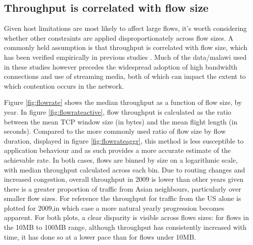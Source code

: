 \subsection{Throughput is correlated with flow size}

Given host limitations are most likely to affect large flows, it's worth considering whether other constraints are applied disproportionately across flow sizes. 
A commonly held assumption is that throughput is correlated with flow size, which has been verified empirically in previous studies \cite{oursTCP, Zhang:2002p85}.
Much of the data/malawi used in these studies however precedes the widespread adoption of high bandwidth connections and use of streaming media, both of which can impact the extent to which contention occurs in the network.

Figure \ref{fig:flowrate} shows the median throughput as a function of flow size, by year.
In figure \ref{fig:flowrateactive}, flow throughput is calculated as the ratio between the mean TCP window size (in bytes) and the mean flight length (in seconds).
Compared to the more commonly used ratio of flow size by flow duration, displayed in figure \ref{fig:flowrateaggr}, this method is less susceptible to application behaviour and as such provides a more accurate estimate of the achievable rate.
In both cases, flows are binned by size on a logarithmic scale, with median throughput calculated across each bin.
Due to routing changes and increased congestion, overall throughput in 2009 is lower than other years given there is a greater proportion of traffic from Asian neighbours, particularly over smaller flow sizes.
For reference the throughput for traffic from the US alone is plotted for 2009,in which case a more natural yearly progression becomes apparent.
For both plots, a clear disparity is visible across flows sizes: for flows in the 10MB to 100MB range, although throughput has consistently increased with time, it has done so at a lower pace than for flows under 10MB. 

